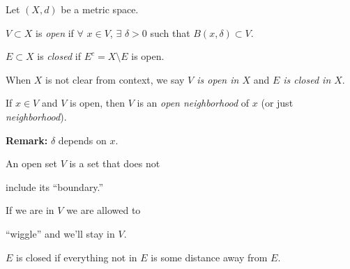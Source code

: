 \documentclass[10pt,aspectratio=169]{beamer}
\begin{document}
\begin{frame}

\begin{definition}
Let $(X,d)$ be a metric space.

\pause
\medskip

$V \subset X$
is \emph{open}
if $\forall$ $x \in V$, $\exists$ $\delta > 0$ such that
$B(x,\delta) \subset V$.

\pause
\medskip

$E \subset X$ is 
\emph{closed} if $E^c = X \setminus E$ is open.

\pause
\medskip

When $X$ is not clear from context,
we say \emph{$V$ is open in $X$} and \emph{$E$ is closed in $X$}.

\pause
\medskip

If $x \in V$ and $V$ is open, then
$V$ is an \emph{open neighborhood} of $x$ (or
just \emph{neighborhood}).
\end{definition}

\pause
\medskip

\hspace*{2.3in}

\pause
\vspace*{-0.9in}

\textbf{Remark:} $\delta$ depends on $x$.

\pause
\medskip

An open set $V$ is a set that does not

include its ``boundary.''

\pause
\medskip

If we are in $V$ we are allowed to

``wiggle'' and we'll stay in $V$.

\pause
\medskip

$E$ is closed if everything not in $E$
is some distance away from $E$.

\end{frame}
\end{document}
